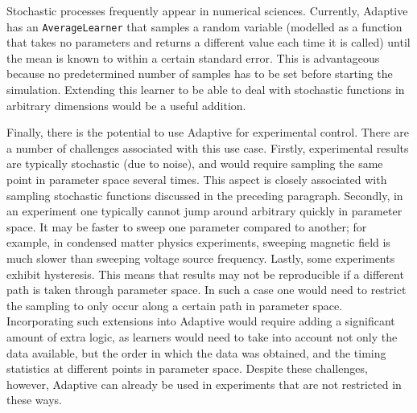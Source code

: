 
Stochastic processes frequently appear in numerical sciences.
Currently, Adaptive has an \passthrough{\lstinline!AverageLearner!} that samples a random variable (modelled as a function that takes no parameters and returns a different value each time it is called) until the mean is known to within a certain standard error.
This is advantageous because no predetermined number of samples has to be set before starting the simulation.
Extending this learner to be able to deal with stochastic functions in arbitrary dimensions would be a useful addition.


Finally, there is the potential to use Adaptive for experimental control.
There are a number of challenges associated with this use case.
Firstly, experimental results are typically stochastic (due to noise), and would require sampling the same point in parameter space several times.
This aspect is closely associated with sampling stochastic functions discussed in the preceding paragraph.
Secondly, in an experiment one typically cannot jump around arbitrary quickly in parameter space.
It may be faster to sweep one parameter compared to another; for example, in condensed matter physics experiments, sweeping magnetic field is much slower than sweeping voltage source frequency.
Lastly, some experiments exhibit hysteresis.
This means that results may not be reproducible if a different path is taken through parameter space.
In such a case one would need to restrict the sampling to only occur along a certain path in parameter space.
Incorporating such extensions into Adaptive would require adding a significant amount of extra logic, as learners would need to take into account not only the data available, but the order in which the data was obtained, and the timing statistics at different points in parameter space.
Despite these challenges, however, Adaptive can already be used in experiments that are not restricted in these ways.

